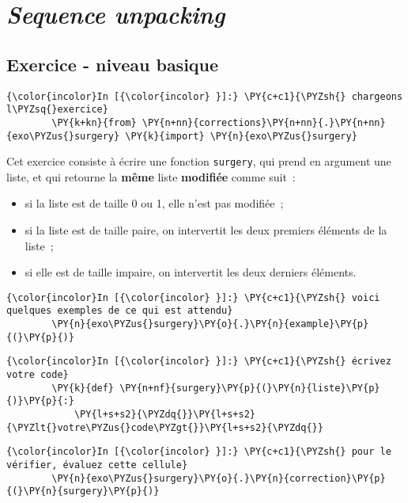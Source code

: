     \hypertarget{sequence-unpacking}{%
\section{\texorpdfstring{\emph{Sequence
unpacking}}{Sequence unpacking}}\label{sequence-unpacking}}

    \hypertarget{exercice---niveau-basique}{%
\subsection{Exercice - niveau basique}\label{exercice---niveau-basique}}

    \begin{Verbatim}[commandchars=\\\{\}]
{\color{incolor}In [{\color{incolor} }]:} \PY{c+c1}{\PYZsh{} chargeons l\PYZsq{}exercice}
        \PY{k+kn}{from} \PY{n+nn}{corrections}\PY{n+nn}{.}\PY{n+nn}{exo\PYZus{}surgery} \PY{k}{import} \PY{n}{exo\PYZus{}surgery}
\end{Verbatim}


    Cet exercice consiste à écrire une fonction \texttt{surgery}, qui prend
en argument une liste, et qui retourne la \textbf{même} liste
\textbf{modifiée} comme suit~:

\begin{itemize}
	\item 
	si la liste est de taille 0 ou 1, elle n'est pas modifiée~;
	\item
	si la liste est de taille paire, on intervertit
	les deux premiers éléments de la liste~;
	\item
	si elle est de taille impaire, on intervertit les deux derniers éléments.
\end{itemize}

    \begin{Verbatim}[commandchars=\\\{\}]
{\color{incolor}In [{\color{incolor} }]:} \PY{c+c1}{\PYZsh{} voici quelques exemples de ce qui est attendu}
        \PY{n}{exo\PYZus{}surgery}\PY{o}{.}\PY{n}{example}\PY{p}{(}\PY{p}{)}
\end{Verbatim}


    \begin{Verbatim}[commandchars=\\\{\}]
{\color{incolor}In [{\color{incolor} }]:} \PY{c+c1}{\PYZsh{} écrivez votre code}
        \PY{k}{def} \PY{n+nf}{surgery}\PY{p}{(}\PY{n}{liste}\PY{p}{)}\PY{p}{:}
            \PY{l+s+s2}{\PYZdq{}}\PY{l+s+s2}{\PYZlt{}votre\PYZus{}code\PYZgt{}}\PY{l+s+s2}{\PYZdq{}}
\end{Verbatim}


    \begin{Verbatim}[commandchars=\\\{\}]
{\color{incolor}In [{\color{incolor} }]:} \PY{c+c1}{\PYZsh{} pour le vérifier, évaluez cette cellule}
        \PY{n}{exo\PYZus{}surgery}\PY{o}{.}\PY{n}{correction}\PY{p}{(}\PY{n}{surgery}\PY{p}{)}
\end{Verbatim}